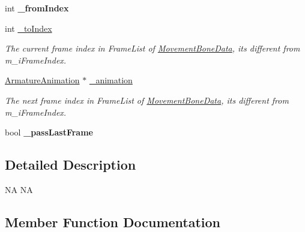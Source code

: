 \begin{DoxyCompactItemize}
\mbox{\label{classcocostudio_1_1Tween_ac649724bea0ba74c6fc31dda1ff04393}} 
int {\bfseries \+\_\+from\+Index}
\item 
\mbox{\label{classcocostudio_1_1Tween_afd12ef108a07689fa608338c79cf343b}} 
int \hyperlink{classcocostudio_1_1Tween_afd12ef108a07689fa608338c79cf343b}{\+\_\+to\+Index}
\begin{DoxyCompactList}\small\item\em The current frame index in Frame\+List of \hyperlink{classcocostudio_1_1MovementBoneData}{Movement\+Bone\+Data}, it\textquotesingle{}s different from m\+\_\+i\+Frame\+Index. \end{DoxyCompactList}\item 
\mbox{\label{classcocostudio_1_1Tween_a3da6c92b28eba2c96fc69f745a7d65ab}} 
\hyperlink{classcocostudio_1_1ArmatureAnimation}{Armature\+Animation} $\ast$ \hyperlink{classcocostudio_1_1Tween_a3da6c92b28eba2c96fc69f745a7d65ab}{\+\_\+animation}
\begin{DoxyCompactList}\small\item\em The next frame index in Frame\+List of \hyperlink{classcocostudio_1_1MovementBoneData}{Movement\+Bone\+Data}, it\textquotesingle{}s different from m\+\_\+i\+Frame\+Index. \end{DoxyCompactList}\item 
\mbox{\label{classcocostudio_1_1Tween_a10a1660d546bf0647fda0468d69254c9}} 
bool {\bfseries \+\_\+pass\+Last\+Frame}
\end{DoxyCompactItemize}


\subsection{Detailed Description}
NA  NA 

\subsection{Member Function Documentation}
\mbox{\label{classcocostudio_1_1Tween_a1bceeb45614a71f31af7359f61b38d5d}} 
